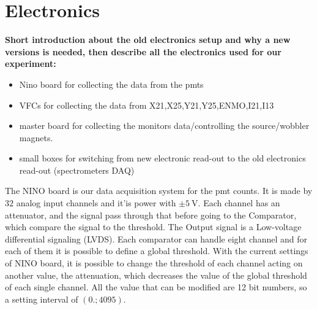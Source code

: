 \section{Electronics}
{\bfseries Short introduction about the old electronics setup and why a new versions is needed, then describe all the electronics used for our experiment:}
\begin{itemize}
\item Nino board for collecting the data from the pmts
\item VFCs for collecting the data from X21,X25,Y21,Y25,ENMO,I21,I13
\item master board for collecting the monitors data/controlling the source/wobbler magnets.
\item small boxes for switching from new electronic read-out to the old electronics read-out (spectrometers DAQ)
\end{itemize}

The NINO board is our data acquisition system for the pmt counts. It is made by $32$ analog input channels and it'is power with $\pm \SI{5}{\volt}$. Each channel has an attenuator, and the signal pass through that before going to the Comparator, which compare the signal to the threshold. The Output signal is a Low-voltage differential signaling (LVDS). Each comparator can handle eight channel and for each of them it is possible to define a global threshold. With the current settings of NINO board, it is possible to change the threshold of each channel acting on another value, the attenuation, which decreases the value of the global threshold of each single channel. All the value that can be modified are 12 bit numbers, so a setting interval of $(0. ; 4095)$.

